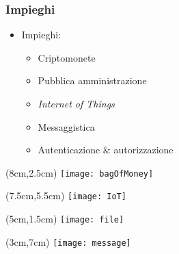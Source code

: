 \begin{frame}
  \frametitle{Impieghi}

  \begin{itemize}
   \item<1-> Impieghi:
   \begin{itemize}
    \item<2-> Criptomonete
    \item<3-> Pubblica amministrazione
    \item<4-> \textit{Internet of Things}
    \item<5-> Messaggistica
    \item<6-> Autenticazione \& autorizzazione
   \end{itemize}
  \end{itemize}

 \begin{textblock*}{5cm}(8cm,2.5cm)
  \texttt{[image: bagOfMoney]}
 \end{textblock*}

 \begin{textblock*}{5cm}(7.5cm,5.5cm)
  \texttt{[image: IoT]}
 \end{textblock*}

 \begin{textblock*}{5cm}(5cm,1.5cm)
  \texttt{[image: file]}
 \end{textblock*}

 \begin{textblock*}{5cm}(3cm,7cm)
  \texttt{[image: message]}
 \end{textblock*}

\end{frame}
